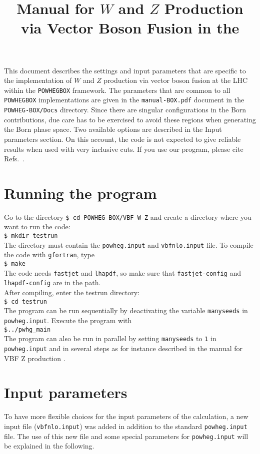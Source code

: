 \documentclass[a4paper,11pt]{article}
\title{Manual for $W$ and $Z$ Production via Vector Boson Fusion in the \POWHEGBOX{}}
\date{}
\newcommand\POWHEGBOX{{\tt POWHEG\;BOX}}
\begin{document}
\maketitle
%
\noindent
This document describes the settings and input parameters that are specific to
the implementation of $W$ and $Z$ production via vector boson fusion at the LHC within the
\POWHEGBOX{} framework. 
%
The parameters that are common to all \POWHEGBOX{} implementations are given in
the {\tt manual-BOX.pdf} document in the {\tt POWHEG-BOX/Docs}
directory. Since there are singular configurations in the Born contributions, due care has to be exercised 
to avoid these regions when generating the Born phase space. Two available options are described in 
the Input parameters section. On this account, the code is not expected to give 
reliable results when used with very inclusive cuts.
If you use our program, please cite
Refs.~\cite{SZ,Oleari:2003tc,Alioli:2010xd}.

\section*{Running the program}
Go to the directory
{\tt \$ cd POWHEG-BOX/VBF\_W-Z}
and create a directory where you want to run the code:
\\[2ex]
{\tt \$ mkdir testrun}
\\[2ex]
The directory must contain the {\tt powheg.input} and {\tt vbfnlo.input} file.
To compile the code with {\tt gfortran}, type 
\\[2ex]
{\tt \$ make}
\\[2ex]
The code needs {\tt fastjet} and {\tt lhapdf}, so make sure that {\tt fastjet-config} and 
{\tt lhapdf-config} are in the path.%
\\[2ex]
After compiling, enter the testrun directory:
\\[2ex]
{\tt \$ cd testrun}
\\[2ex]
The program can be run sequentially by deactivating the variable {\tt manyseeds} in {\tt powheg.input}. Execute the program with
\\[2ex]
{\tt \$../pwhg\_main}
\\[2ex]
The program can also be run in parallel by setting {\tt manyseeds} to {\tt 1} in {\tt powheg.input}
and in several steps as for instance described in the manual 
for VBF Z production \cite{JSZ}.
\\[2ex]
\section*{Input parameters}
To have more flexible choices for the input parameters of the calculation, a new input file 
({\tt vbfnlo.input}) was added 
in addition to the standard {\tt powheg.input} file. The use of this new file and some special parameters 
for {\tt powheg.input} will be explained in the following.
\end{document}
